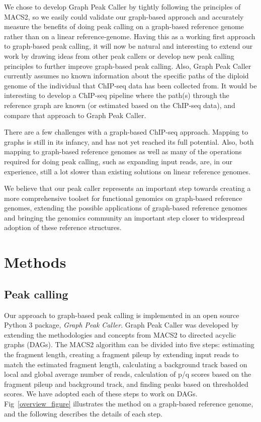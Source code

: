 \documentclass[10pt,letterpaper]{article}
\begin{document}
We chose to develop Graph Peak Caller by tightly following the principles of MACS2, so we easily could validate our graph-based approach and accurately measure the benefits of doing peak calling on a graph-based reference genome rather than on a linear reference-genome. Having this as a working first approach to graph-based peak calling, it will now be natural and interesting  to extend our work by drawing ideas from other peak callers or develop new peak calling principles to further improve graph-based peak calling. Also, Graph Peak Caller currently assumes no known information about the specific paths of the diploid genome of the individual that ChIP-seq data has been collected from. It would be interesting to develop a ChIP-seq pipeline where the path(s) through the reference graph are known (or estimated based on the ChIP-seq data), and compare that approach to Graph Peak Caller.

There are a few challenges with a graph-based ChIP-seq approach. Mapping to graphs is still in its infancy, and has not yet reached its full potential. Also, both mapping to graph-based reference genomes as well as many of the operations required for doing peak calling, such as expanding input reads, are, in our experience, still a lot slower than existing solutions on linear reference genomes. 

We believe that our peak caller represents an important step towards creating a more comprehensive toolset for functional genomics on graph-based reference genomes, extending the possible applications of graph-based reference genomes and bringing the genomics community an important step closer to widespread adoption of these reference structures.

\section*{Methods}
\subsection*{Peak calling}
Our approach to graph-based peak calling is implemented in an open source Python 3 package, \emph{Graph Peak Caller}. Graph Peak Caller was developed by extending the methodologies and concepts from MACS2 to directed acyclic graphs (DAGs). The MACS2 algorithm can be divided into five steps: estimating the fragment length, creating a fragment pileup by extending input reads to match the estimated fragment length, calculating a background track based on local and global average number of reads, calculation of p/q scores based on the fragment pileup and background track, and finding peaks based on thresholded scores. We have adopted each of these steps to work on DAGs. Fig~\ref{overview_figure} illustrates the method on a graph-based reference genome, and the following describes the details of each step.
\end{document}
